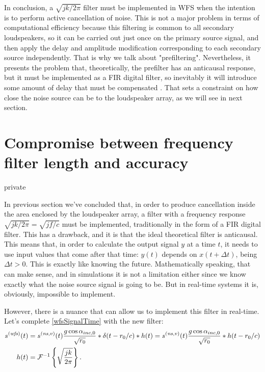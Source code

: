 In conclusion, %
a $\sqrt{jk/2\pi}$ filter must be implemented in WFS when the intention is to perform active cancellation of noise.
This is not a major problem in terms of computational efficiency because this filtering is common to all secondary loudspeakers, so it can be carried out just once on the primary source signal, and then apply the delay and amplitude modification corresponding to each secondary source independently. That is why we talk about "prefiltering".
Nevertheless, it presents the problem that, theoretically, the prefilter has an anticausal response, but it must be implemented as a FIR digital filter, so inevitably it will introduce some amount of delay that must be compensated \cite{Lapini2018}. That sets a constraint on how close the noise source can be to the loudspeaker array, as we will see in next section.

\section{Compromise between frequency filter length and accuracy}

\begin{shownto}{private}
\end{shownto}

In previous section we've concluded that, in order to produce cancellation inside the area enclosed by the loudspeaker array, a filter with a frequency response $\sqrt{jk/2\pi} = \sqrt{jf/c}$ must be implemented, traditionally in the form of a FIR digital filter. This has a drawback, and it is that the ideal theoretical filter is anticausal. This means that, in order to calculate the output signal $y$ at a time $t$, it needs to use input values that come after that time: $y(t)$ depends on $x(t+\Delta t)$, being $\Delta t > 0$. This is exactly like knowing the future. Mathematically speaking, that can make sense, and in simulations it is not a limitation either since we know exactly what the noise source signal is going to be.
But in real-time systems it is, obviously, impossible to implement.

However, there is a nuance that can allow us to implement this filter in real-time. Let's complete \autoref{wfsSignalTime} with the new filter:
\begin{equation}
\begin{aligned}
\signal[wfs][time](t) &= \signal[nsVirt][time](t) \frac{g \cos\normPrimaryPropAngleSection}{\sqrt{\distLinePrimSource}}
\ast\delta(t - \distLinePrimSource/c)\ast \freqFilter(t) = \signal[nsVirt][time](t) \frac{g \cos\normPrimaryPropAngleSection}{\sqrt{\distLinePrimSource}}
\ast \freqFilter(t - \distLinePrimSource/c)\\
\freqFilter(t) &= \FourierTransform{\sqrt{\frac{jk}{2\pi}}}[inverse].
\end{aligned}
\label{rayleigh2_5Dsignal}
\end{equation}

